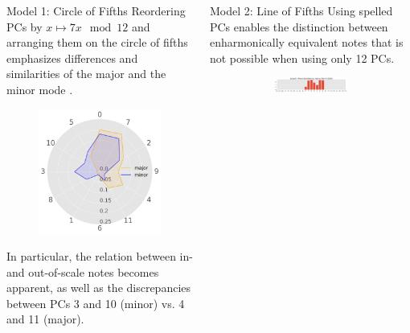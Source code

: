 \documentclass[final,cmyk]{beamer}
\begin{document}
\begin{frame}[t]
\begin{minipage}[t][.68\textheight][t]{\textwidth}
\begin{columns}[t]
\begin{column}{0.3\textwidth}
      \begin{block}{Model 1: Circle of Fifths}
				\alert{Reordering} PCs by $x\mapsto 7x \mod 12$ and arranging them on the \alert{circle of fifths} emphasizes differences and similarities of the major and the minor mode \autocite{Harasim2019}.
        \begin{figure}
          \centering
          \includegraphics[width=.8\textwidth]{img/radars}
        \end{figure}

				In particular, the relation between in- and out-of-scale notes becomes apparent,
				as well as the discrepancies between PCs 3 and 10 (minor) vs. 4 and 11 (major).

      \end{block}


    \end{column}

    \begin{column}{0.3\textwidth}

      \begin{block}{Model 2: Line of Fifths}
        Using \alert{spelled PCs} enables the distinction between enharmonically equivalent notes
				that is not possible when using only 12 PCs.
        \begin{figure}
				\centering

				\begin{subfigure}{\textwidth} %
					\includegraphics[width=\textwidth]{img/gmm_josquin.png}
				\end{subfigure}


\end{figure}
\end{block}
\end{column}
\end{columns}
\end{minipage}
\end{frame}
\end{document}
